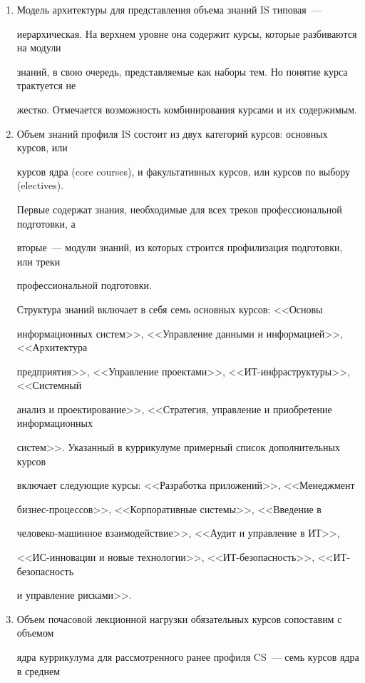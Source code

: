 \begin{enumerate}[1.]

\item Модель архитектуры для представления объема знаний IS типовая~--- 

иерархическая. На верхнем уровне она содержит курсы, которые разбиваются на модули 

знаний, в свою очередь, представляемые как наборы тем. Но понятие курса трактуется не 

жестко. Отмечается возможность комбинирования курсами и их содержимым.

\item Объем знаний профиля IS состоит из двух категорий курсов: основных курсов, или 

курсов ядра (core courses), и факультативных курсов, или курсов по выбору (electives). 

Первые содержат знания, необходимые для всех треков профессиональной подготовки, а 

вторые~--- модули знаний, из которых строится профилизация подготовки, или треки 

профессиональной подготовки.



Структура знаний включает в себя семь основных курсов: <<Основы 

информационных систем>>, <<Управление данными и информацией>>, <<Архитектура 

предприятия>>, <<Управление проектами>>, <<ИТ-инфраструктуры>>, <<Системный 

анализ и проектирование>>, <<Стратегия, управление и приобретение информационных 

систем>>. Указанный в куррикулуме примерный список дополнительных курсов 

включает следующие курсы: <<Разработка приложений>>, <<Менеджмент 

биз\-нес-про\-цес\-сов>>, <<Корпоративные системы>>, <<Введение в 

че\-ло\-ве\-ко-ма\-шин\-ное взаимодействие>>, <<Аудит и управ\-ле\-ние в ИТ>>, 

<<ИС-ин\-но\-ва\-ции и новые технологии>>, <<ИТ-безопасность>>, <<ИТ-безопасность 

и управление рисками>>.

\item Объем почасовой лекционной нагрузки обязательных курсов сопоставим с объемом 

ядра куррикулума для рассмотренного ранее профиля CS~--- семь курсов ядра в среднем 


\end{enumerate}
